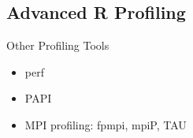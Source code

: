 \subsection{Advanced R Profiling}
\makesubcontentsslidessec

\begin{frame}
  \begin{block}{Other Profiling Tools}
    \begin{itemize}
      \item perf
      \item PAPI
      \item MPI profiling: fpmpi, mpiP, TAU
    \end{itemize}
  \end{block}
\end{frame}



